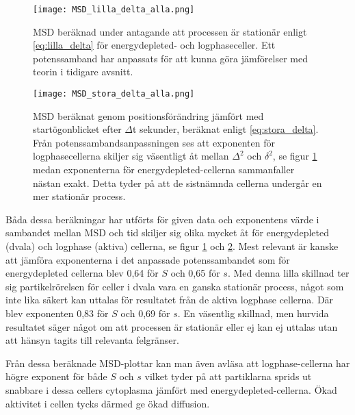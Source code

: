 \begin{figure}
    \centering
    \texttt{[image: MSD\_lilla\_delta\_alla.png]}
    \caption{MSD beräknad under antagande att processen är stationär enligt \eqref{eq:lilla_delta} för energydepleted- och logphaseceller. Ett potenssamband har anpassats för att kunna göra jämförelser med teorin i tidigare avsnitt.}
    \label{fig:MSD_ld}
\end{figure}
\begin{figure}
    \centering
    \texttt{[image: MSD\_stora\_delta\_alla.png]}
    \caption{MSD beräknat genom positionsförändring jämfört med startögonblicket efter $\Delta$t sekunder, beräknat enligt \eqref{eq:stora_delta}. Från potenssambandsanpassningen ses att exponenten för logphasecellerna skiljer sig väsentligt åt mellan $\Delta^2$ och $\delta^2$, se figur \ref{fig:MSD_ld} medan exponenterna för energydepleted-cellerna sammanfaller nästan exakt. Detta tyder på att de sistnämnda cellerna undergår en mer stationär process.}
    \label{fig:MSD_sd}
\end{figure}

\begin{figure}\centerline{
\subfigure[][]{
\resizebox{0.5\textwidth}{!}{}
}
\subfigure[][]{
\resizebox{0.5\textwidth}{!}{}
}}
\caption{}
\label{fig:MSD}
\end{figure}


Båda dessa beräkningar har utförts för given data och exponentens värde i sambandet mellan MSD och tid skiljer sig olika mycket åt för energydepleted (dvala) och logphase (aktiva) cellerna, se figur \ref{fig:MSD_ld} och \ref{fig:MSD_sd}. Mest relevant är kanske att jämföra exponenterna i det anpassade potenssambandet som för energydepleted cellerna blev 0,64 för $S$ och 0,65 för $s$. Med denna lilla skillnad ter sig partikelrörelsen för celler i dvala vara en ganska stationär process, något som inte lika säkert kan uttalas för resultatet från de aktiva logphase cellerna. Där blev exponenten 0,83 för $S$ och 0,69 för $s$. En väsentlig skillnad, men hurvida resultatet säger något om att processen är stationär eller ej kan ej uttalas utan att hänsyn tagits till relevanta felgränser.

Från dessa beräknade MSD-plottar kan man även avläsa att logphase-cellerna har högre exponent  för både $S$ och $s$ vilket tyder på att partiklarna sprids ut snabbare i dessa cellers cytoplasma jämfört med energydepleted-cellerna. Ökad aktivitet i cellen tycks därmed ge ökad diffusion.



